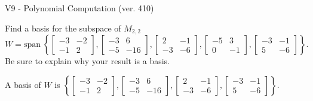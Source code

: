 \begin{exercise}
  \begin{exerciseTitle}V9 - Polynomial Computation (ver. 410)\end{exerciseTitle}
  \begin{exerciseStatement}
    Find a basis for the subspace of \(M_{2,2}\) 
\[W=\mathrm{span}\ \left\{\left[\begin{array}{cc}
-3 & -2 \\
-1 & 2
\end{array}\right] , \left[\begin{array}{cc}
-3 & 6 \\
-5 & -16
\end{array}\right] , \left[\begin{array}{cc}
2 & -1 \\
-3 & -6
\end{array}\right] , \left[\begin{array}{cc}
-5 & 3 \\
0 & -1
\end{array}\right] , \left[\begin{array}{cc}
-3 & -1 \\
5 & -6
\end{array}\right]\right\}.\]
 Be sure to explain why your result is a basis.


  \end{exerciseStatement}
  \begin{exerciseAnswer}
   A basis of \(W\) is  \(\left\{\left[\begin{array}{cc}
-3 & -2 \\
-1 & 2
\end{array}\right] , \left[\begin{array}{cc}
-3 & 6 \\
-5 & -16
\end{array}\right] , \left[\begin{array}{cc}
2 & -1 \\
-3 & -6
\end{array}\right] , \left[\begin{array}{cc}
-3 & -1 \\
5 & -6
\end{array}\right]\right\}\).
  


  \end{exerciseAnswer}
\end{exercise}